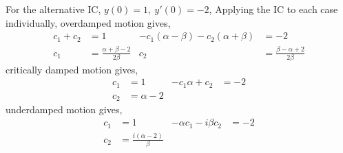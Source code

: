 \begin{enumerate}
\begin{enumerate}
                    For the alternative IC, $ y(0) = 1,\ y'(0) = -2 $, \newline
                    Applying the IC to each case individually, overdamped motion gives,
                    \begin{align}
                        c_{1} + c_{2} & = 1                                 & -c_{1}(\alpha - \beta) - c_{2}(\alpha + \beta) & = -2                                \\
                        c_{1}         & = \frac{\alpha + \beta - 2}{2\beta} & c_{2}                                          & = \frac{\beta - \alpha + 2}{2\beta}
                    \end{align}
                    critically damped motion gives,
                    \begin{align}
                        c_{1} & = 1          & -c_{1}\alpha + c_{2} & = -2 \\
                        c_{2} & = \alpha - 2
                    \end{align}
                    underdamped motion gives,
                    \begin{align}
                        c_{1} & = 1                           & -\alpha c_{1} - i\beta c_{2} & = -2 \\
                        c_{2} & = \frac{i(\alpha - 2)}{\beta}
                    \end{align}

                    \begin{figure}[H]
                        \centering
                    \end{figure}


\end{enumerate}
\end{enumerate}
